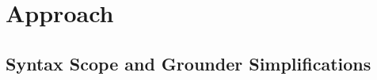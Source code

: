 \section{Approach}\label{sec:approach}

\newcommand\Lb[1]{\mathit{Lb}(#1)}
\newcommand\InvLb[1]{\mathit{Lb}^{-1}(#1)}
\newcommand\Lbs[1]{\mathit{Lbs}(#1)}
\def\eqdef{\stackrel{\text{df}}{=}}
\newcommand\Hd[1]{\mathit{Head}(#1)}
\newcommand\HH[1]{\mathit{H}(#1)}
\newcommand\BB[1]{\mathit{B}^+(#1)}
\newcommand\BBn[1]{\mathit{B}^-(#1)}
\newcommand\Bd[1]{\mathit{Body}(#1)}
\newcommand\Bdp[1]{\mathit{Body}^+(#1)}
\newcommand\Bdn[1]{\mathit{Body}^-(#1)}
\def\eqdef{\stackrel{\text{df}}{=}}

\subsection{Syntax Scope and Grounder Simplifications}

